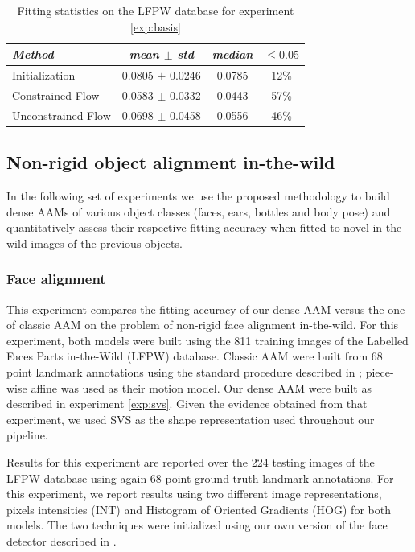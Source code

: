 \begin{table}[t]
\small
\centering
\begin{tabular}{|l|c|c|c|}
\hline
\emph{Method}       & \emph{mean $\pm$ std} & \emph{median} & $\leq 0.05$\\
\hline\hline
Initialization      & 0.0805 $\pm$ 0.0246 & 0.0785 & 12\%\\
Constrained Flow    & 0.0583 $\pm$ 0.0332 & 0.0443 & 57\%\\
Unconstrained Flow  & 0.0698 $\pm$ 0.0458 & 0.0556 & 46\%\\
\hline
\end{tabular}
\caption{Fitting statistics on the LFPW database for experiment \ref{exp:basis}}
\label{tab:basis_stats}
\end{table}



\subsection{Non-rigid object alignment in-the-wild}
\label{exp:alignment}

In the following set of experiments we use the proposed methodology to build dense AAMs of various object classes (faces, ears, bottles and body pose) and quantitatively assess their respective fitting accuracy when fitted to novel in-the-wild images of the previous objects.

\subsubsection{Face alignment}
\label{exp:face}

This experiment compares the fitting accuracy of our dense AAM versus the one of classic AAM on the problem of non-rigid face alignment in-the-wild. For this experiment, both models were built using the 811 training images of the Labelled Faces Parts in-the-Wild (LFPW) \cite{Belhumeur2011} database. Classic AAM were built from 68 point landmark annotations using the standard procedure described in \cite{Cootes2001, Matthews2004}; piece-wise affine was used as their motion model. Our dense AAM were built as described in experiment \ref{exp:svs}. Given the evidence obtained from that experiment, we used SVS as the shape representation used throughout our pipeline.

Results for this experiment are reported over the 224 testing images of the LFPW database using again 68 point ground truth landmark annotations. For this experiment, we report results using two different image representations, \ie pixels intensities (INT) and Histogram of Oriented Gradients (HOG) \cite{Dalal2005} for both models. The two techniques were initialized using our own version of the face detector described in \cite{Zhu2012}.

